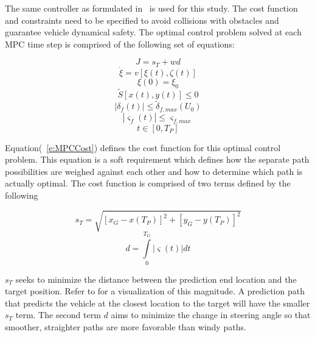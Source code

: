 \documentclass[12pt,twocolumn]{article}
\begin{document}
The same controller as formulated in~\cite{fix_me} is used for this study. The cost function and constraints need to be specified to avoid collisions with obstacles and guarantee vehicle dynamical safety. The optimal control problem solved at each MPC time step is comprised of the following set of equations:

\begin{equation}\label{e:MPCCost}
J = s_T + wd 
\end{equation}
\begin{equation}\label{e:State_ODE}
\dot{\xi} = v\left[\xi\left(t\right),\zeta\left(t\right)\right] 
\end{equation}
\begin{equation}\label{e:InitialStates}
\xi\left(0\right) = \xi_0 
\end{equation}
\begin{equation}\label{e:SafeArea}
\tilde{S}\left[x\left(t\right),y\left(t\right)\right] \leq0  
\end{equation}
\begin{equation}\label{e:SteerLimit}
\left|\delta_f\left(t\right)\right| \leq\tilde{\delta}_{f,max}\left(U_0\right) 
\end{equation}
\begin{equation}\label{e:SteerRateLimit}
\left|\varsigma_f\left(t\right)\right| \leq\varsigma_{f,max} 
\end{equation}
\begin{equation}\label{e:TimeDomain}
t \in \left[0,T_P\right]
\end{equation}

Equation(~\ref{e:MPCCost}) defines the cost function for this optimal control problem. This equation is a soft requirement which defines how the separate path possibilities are weighed against each other and how to determine which path is actually optimal. The cost function is comprised of two terms defined by the following

\begin{equation}\label{e:DistanceCost}
s_T = \sqrt{\left[ x_G - x\left(T_P\right)\right]^2 + \left[y_G - y\left(T_P\right)\right]^2 }
\end{equation}
\begin{equation}\label{e:TurningCost}
d = \int \limits_0^{T_G} \left|\varsigma\left(t\right)\right| dt 
\end{equation}

$s_{T}$ seeks to minimize the distance between the prediction end location and the target position. Refer to  for a visualization of this magnitude. A prediction path that predicts the vehicle at the closest location to the target will have the smaller $s_{T}$ term. The second term $d$ aims to minimize the change in steering angle so that smoother, straighter paths are more favorable than windy paths.
\end{document}
